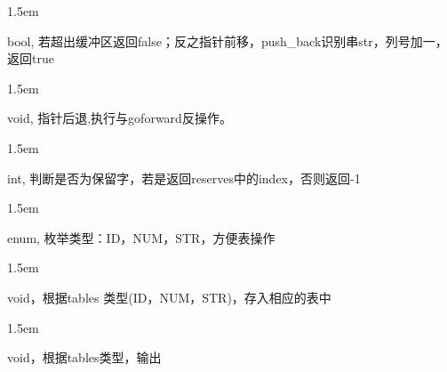 \documentclass{article}
\begin{document}
\begin{mddefinitions}

\begin{mdbmarginx}{}{}{}{1.5em}%
\begin{mddefdata}%
bool, 若超出缓冲区返回false；反之指针前移，push\_back识别串str，列号加一，返回true
\end{mddefdata}%
\end{mdbmarginx}%


\begin{mdbmarginx}{}{}{}{1.5em}%
\begin{mddefdata}%
void, 指针后退,执行与goforward反操作。
\end{mddefdata}%
\end{mdbmarginx}%


\begin{mdbmarginx}{}{}{}{1.5em}%
\begin{mddefdata}%
int, 判断是否为保留字，若是返回reserves中的index，否则返回-1
\end{mddefdata}%
\end{mdbmarginx}%


\begin{mdbmarginx}{}{}{}{1.5em}%
\begin{mddefdata}%
enum, 枚举类型：ID，NUM，STR，方便表操作
\end{mddefdata}%
\end{mdbmarginx}%


\begin{mdbmarginx}{}{}{}{1.5em}%
\begin{mddefdata}%
void，根据tables 类型(ID，NUM，STR)，存入相应的表中
\end{mddefdata}%
\end{mdbmarginx}%


\begin{mdbmarginx}{}{}{}{1.5em}%
\begin{mddefdata}%
void，根据tables类型，输出
\end{mddefdata}%
\end{mdbmarginx}%


\end{mddefinitions}
\end{document}
